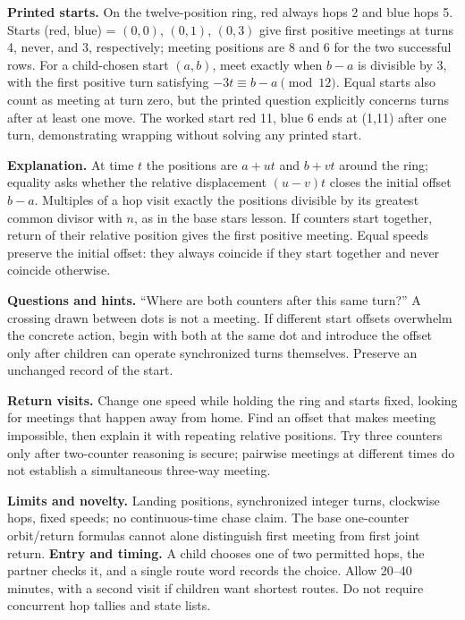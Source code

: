 \textbf{Printed starts.} On the twelve-position ring, red always hops 2 and blue hops 5. Starts (red, blue) = $(0,0)$, $(0,1)$, $(0,3)$ give first positive meetings at turns 4, never, and 3, respectively; meeting positions are 8 and 6 for the two successful rows. For a child-chosen start $(a,b)$, meet exactly when $b-a$ is divisible by 3, with the first positive turn satisfying $-3t\equiv b-a\pmod{12}$. Equal starts also count as meeting at turn zero, but the printed question explicitly concerns turns after at least one move. The worked start red 11, blue 6 ends at (1,11) after one turn, demonstrating wrapping without solving any printed start.

\textbf{Explanation.} At time $t$ the positions are $a+ut$ and $b+vt$ around the ring; equality asks whether the relative displacement $(u-v)t$ closes the initial offset $b-a$. Multiples of a hop visit exactly the positions divisible by its greatest common divisor with $n$, as in the base stars lesson. If counters start together, return of their relative position gives the first positive meeting. Equal speeds preserve the initial offset: they always coincide if they start together and never coincide otherwise.

\textbf{Questions and hints.} ``Where are both counters after this same turn?'' A crossing drawn between dots is not a meeting. If different start offsets overwhelm the concrete action, begin with both at the same dot and introduce the offset only after children can operate synchronized turns themselves. Preserve an unchanged record of the start.

\textbf{Return visits.} Change one speed while holding the ring and starts fixed, looking for meetings that happen away from home. Find an offset that makes meeting impossible, then explain it with repeating relative positions. Try three counters only after two-counter reasoning is secure; pairwise meetings at different times do not establish a simultaneous three-way meeting.

\textbf{Limits and novelty.} Landing positions, synchronized integer turns, clockwise hops, fixed speeds; no continuous-time chase claim. The base one-counter orbit/return formulas cannot alone distinguish first meeting from first joint return.
\newpage
{}
\textbf{Entry and timing.} A child chooses one of two permitted hops, the partner checks it, and a single route word records the choice. Allow 20--40 minutes, with a second visit if children want shortest routes. Do not require concurrent hop tallies and state lists.


